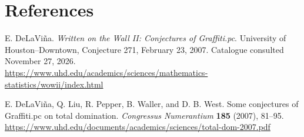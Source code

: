 \documentclass[10pt]{article}
\begin{document}
\section*{References}
\small\raggedright
\noindent[1] E. DeLaVi\~na. \emph{Written on the Wall II: Conjectures of
Graffiti.pc}. University of Houston--Downtown, Conjecture 271, February 23,
2007. Catalogue consulted November 27, 2026.\\
\url{https://www.uhd.edu/academics/sciences/mathematics-statistics/wowii/index.html}

\smallskip
\noindent[2] E. DeLaVi\~na, Q. Liu, R. Pepper, B. Waller, and D. B. West.
Some conjectures of Graffiti.pc on total domination. \emph{Congressus
Numerantium} \textbf{185} (2007), 81--95.\\
\url{https://www.uhd.edu/documents/academics/sciences/total-dom-2007.pdf}
\end{document}
